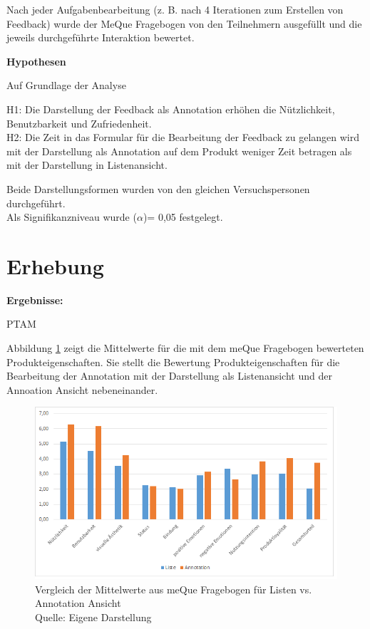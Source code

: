 Nach jeder Aufgabenbearbeitung (z. B. nach 4 Iterationen zum Erstellen von Feedback) wurde der MeQue Fragebogen von den Teilnehmern ausgefüllt und die jeweils durchgeführte Interaktion bewertet. 

\textbf{Hypothesen}

Auf Grundlage der Analyse 

H1: Die Darstellung der Feedback als Annotation erhöhen die Nützlichkeit, Benutzbarkeit und Zufriedenheit.\\
\vspace{2mm}H2: Die Zeit in das Formular für die Bearbeitung der Feedback zu gelangen wird mit der Darstellung als Annotation auf dem Produkt weniger Zeit betragen als mit der Darstellung in Listenansicht. 

Beide Darstellungsformen wurden von den gleichen Versuchspersonen durchgeführt.\\ 
Als Signifikanzniveau wurde ($\alpha$)= 0,05 festgelegt. 

\section{Erhebung}

\textbf{Ergebnisse:}

\ac{PTAM}

Abbildung \ref{img:avg_meQue_listAnnotation} zeigt die Mittelwerte für die mit dem meQue Fragebogen bewerteten Produkteigenschaften. 
Sie stellt die Bewertung Produkteigenschaften für die Bearbeitung der Annotation mit der Darstellung als Listenansicht und der Annoation Ansicht nebeneinander. 

\begin{figure}[H]
	\centering
	\includegraphics[width=1.0\textwidth]{resources/evaluation/diagrammmittel_vergleich_liste_annotation.png}
	\caption{Vergleich der Mittelwerte aus meQue Fragebogen für Listen vs. Annotation Ansicht \\Quelle:  Eigene Darstellung}
	\label{img:avg_meQue_listAnnotation}
\end{figure}

